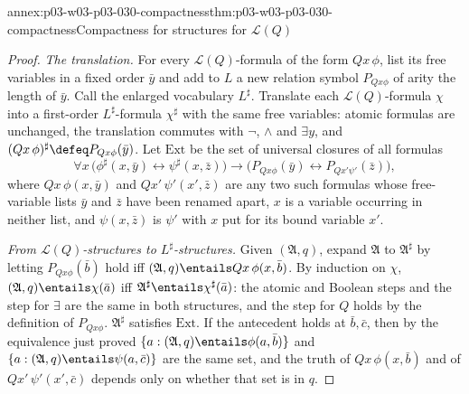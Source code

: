 \begin{annexitem}{annex:p03-w03-p03-030-compactness}{thm:p03-w03-p03-030-compactness}{Compactness for structures for \(\mathscr L(Q)\)}
\begin{proof}
\emph{The translation.}  For every \(\mathscr L(Q)\)-formula of the form
\(Qx\,\phi\), list its free variables in a fixed order \(\bar y\) and add to
\(L\) a new relation symbol \(P_{Qx\phi}\) of arity the length of \(\bar y\).
Call the enlarged vocabulary \(L^\sharp\).  Translate each
\(\mathscr L(Q)\)-formula \(\chi\) into a first-order \(L^\sharp\)-formula
\(\chi^\sharp\) with the same free variables: atomic formulas are unchanged,
the translation commutes with \(\neg\), \(\wedge\) and \(\exists y\), and
\((Qx\,\phi)^\sharp\defeq P_{Qx\phi}(\bar y)\).  Let \(\mathrm{Ext}\) be the
set of universal closures of all formulas
\[
 \forall x\,\bigl(\phi^\sharp(x,\bar y)\leftrightarrow\psi^\sharp(x,\bar z)\bigr)
 \rightarrow\bigl(P_{Qx\phi}(\bar y)\leftrightarrow P_{Qx'\psi'}(\bar z)\bigr),
\]
where \(Qx\,\phi(x,\bar y)\) and \(Qx'\,\psi'(x',\bar z)\) are any two such
formulas whose free-variable lists \(\bar y\) and \(\bar z\) have been renamed
apart, \(x\) is a variable occurring in neither list, and \(\psi(x,\bar z)\)
is \(\psi'\) with \(x\) put for its bound variable \(x'\).

\emph{From \(\mathscr L(Q)\)-structures to \(L^\sharp\)-structures.}  Given
\((\mathfrak A,q)\), expand \(\mathfrak A\) to \(\mathfrak A^\sharp\) by
letting \(P_{Qx\phi}(\bar b)\) hold iff \((\mathfrak A,q)\entails
Qx\,\phi(x,\bar b)\).  By induction on \(\chi\),
\((\mathfrak A,q)\entails\chi(\bar a)\) iff \(\mathfrak
A^\sharp\entails\chi^\sharp(\bar a)\): the atomic and Boolean steps and the
step for \(\exists\) are the same in both structures, and the step for \(Q\)
holds by the definition of \(P_{Qx\phi}\).  \(\mathfrak A^\sharp\) satisfies
\(\mathrm{Ext}\).  If the antecedent holds at \(\bar b,\bar c\), then by the
equivalence just proved \(\{a:(\mathfrak A,q)\entails\phi(a,\bar b)\}\) and
\(\{a:(\mathfrak A,q)\entails\psi(a,\bar c)\}\) are the same set, and the
truth of \(Qx\,\phi(x,\bar b)\) and of \(Qx'\,\psi'(x',\bar c)\) depends only
on whether that set is in \(q\).


\end{proof}
\end{annexitem}

